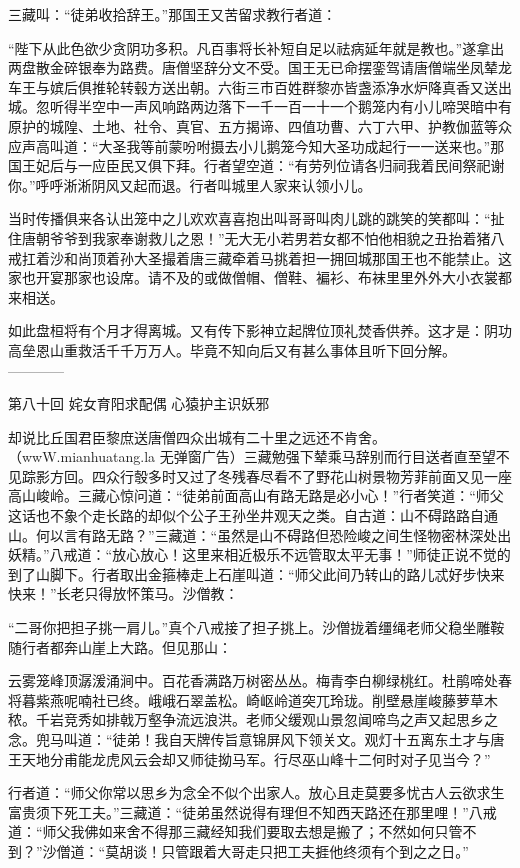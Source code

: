 \documentclass[12pt,UTF8]{ctexbook}
\begin{document}
{	三藏叫：“徒弟收拾辞王。”那国王又苦留求教行者道：
	
	“陛下从此色欲少贪阴功多积。凡百事将长补短自足以祛病延年就是教也。”遂拿出两盘散金碎银奉为路费。唐僧坚辞分文不受。国王无已命摆銮驾请唐僧端坐凤辇龙车王与嫔后俱推轮转毂方送出朝。六街三市百姓群黎亦皆盏添净水炉降真香又送出城。忽听得半空中一声风响路两边落下一千一百一十一个鹅笼内有小儿啼哭暗中有原护的城隍、土地、社令、真官、五方揭谛、四值功曹、六丁六甲、护教伽蓝等众应声高叫道：“大圣我等前蒙吩咐摄去小儿鹅笼今知大圣功成起行一一送来也。”那国王妃后与一应臣民又俱下拜。行者望空道：“有劳列位请各归祠我着民间祭祀谢你。”呼呼淅淅阴风又起而退。行者叫城里人家来认领小儿。
	
	当时传播俱来各认出笼中之儿欢欢喜喜抱出叫哥哥叫肉儿跳的跳笑的笑都叫：“扯住唐朝爷爷到我家奉谢救儿之恩！”无大无小若男若女都不怕他相貌之丑抬着猪八戒扛着沙和尚顶着孙大圣撮着唐三藏牵着马挑着担一拥回城那国王也不能禁止。这家也开宴那家也设席。请不及的或做僧帽、僧鞋、褊衫、布袜里里外外大小衣裳都来相送。
	
	如此盘桓将有个月才得离城。又有传下影神立起牌位顶礼焚香供养。这才是：阴功高垒恩山重救活千千万万人。毕竟不知向后又有甚么事体且听下回分解。
	------------
	
	第八十回 姹女育阳求配偶 心猿护主识妖邪
	
	却说比丘国君臣黎庶送唐僧四众出城有二十里之远还不肯舍。（wwW.mianhuatang.la 无弹窗广告）三藏勉强下辇乘马辞别而行目送者直至望不见踪影方回。四众行彀多时又过了冬残春尽看不了野花山树景物芳菲前面又见一座高山峻岭。三藏心惊问道：“徒弟前面高山有路无路是必小心！”行者笑道：“师父这话也不象个走长路的却似个公子王孙坐井观天之类。自古道：山不碍路路自通山。何以言有路无路？”三藏道：“虽然是山不碍路但恐险峻之间生怪物密林深处出妖精。”八戒道：“放心放心！这里来相近极乐不远管取太平无事！”师徒正说不觉的到了山脚下。行者取出金箍棒走上石崖叫道：“师父此间乃转山的路儿忒好步快来快来！”长老只得放怀策马。沙僧教：
	
	“二哥你把担子挑一肩儿。”真个八戒接了担子挑上。沙僧拢着缰绳老师父稳坐雕鞍随行者都奔山崖上大路。但见那山：
	
	云雾笼峰顶潺湲涌涧中。百花香满路万树密丛丛。梅青李白柳绿桃红。杜鹃啼处春将暮紫燕呢喃社已终。峨峨石翠盖松。崎岖岭道突兀玲珑。削壁悬崖峻藤萝草木秾。千岩竞秀如排戟万壑争流远浪洪。老师父缓观山景忽闻啼鸟之声又起思乡之念。兜马叫道：“徒弟！我自天牌传旨意锦屏风下领关文。观灯十五离东土才与唐王天地分甫能龙虎风云会却又师徒拗马军。行尽巫山峰十二何时对子见当今？”
	
	行者道：“师父你常以思乡为念全不似个出家人。放心且走莫要多忧古人云欲求生富贵须下死工夫。”三藏道：“徒弟虽然说得有理但不知西天路还在那里哩！”八戒道：“师父我佛如来舍不得那三藏经知我们要取去想是搬了；不然如何只管不到？”沙僧道：“莫胡谈！只管跟着大哥走只把工夫捱他终须有个到之之日。”
	
}
\end{document}
